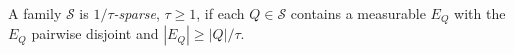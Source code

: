 
A family $\mathcal S$ is \emph{$1/\tau$-sparse}, $\tau\ge1$, if each $Q\in\mathcal S$ contains a measurable $E_Q$ with the $E_Q$ pairwise disjoint and $|E_Q|\ge|Q|/\tau$.
